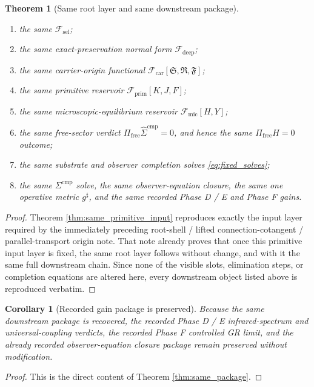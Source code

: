 \documentclass[11pt]{article}
\newcommand{\CompletedMetric}{g^{\sharp}}
\newcommand{\CompLift}{\widehat\Sigma^{\mathrm{cmp}}}
\newcommand{\FreeProj}{\Pi_{\mathrm{free}}}
\newcommand{\GaugeAux}{Y}
\newcommand{\MicFunctional}{\mathscr F_{\mathrm{mic}}}
\newcommand{\PrimFunctional}{\mathscr F_{\mathrm{prim}}}
\newcommand{\CarrierFunctional}{\mathscr F_{\mathrm{car}}}
\newcommand{\DeepFunctional}{\mathscr F_{\mathrm{deep}}}
\newcommand{\StemFunctional}{\mathscr F_{\mathrm{sel}}}
\newcommand{\PrimStrain}{K}
\newcommand{\PrimNeutral}{J}
\newcommand{\PrimFree}{F}
\newcommand{\CarrierSeed}{\mathfrak S}
\newcommand{\RelabelSeed}{\mathfrak R}
\newcommand{\FreeSeed}{\mathfrak F}
\newtheorem{corollary}{Corollary}
\newtheorem{theorem}{Theorem}
\begin{document}
\begin{theorem}[Same root layer and same downstream package]
\begin{enumerate}
    \item the same \(\StemFunctional\);
    \item the same exact-preservation normal form \(\DeepFunctional\);
    \item the same carrier-origin functional \(\CarrierFunctional[\CarrierSeed,\RelabelSeed,\FreeSeed]\);
    \item the same primitive reservoir \(\PrimFunctional[\PrimStrain,\PrimNeutral,\PrimFree]\);
    \item the same microscopic-equilibrium reservoir \(\MicFunctional[H,\GaugeAux]\);
    \item the same free-sector verdict \(\FreeProj\CompLift=0\), and hence the same \(\Pi_{\mathrm{free}}H=0\) outcome;
    \item the same substrate and observer completion solves \eqref{eq:fixed_solves};
    \item the same \(\Sigma^{\mathrm{cmp}}\) solve, the same observer-equation closure, the same one operative metric \(\CompletedMetric\), and the same recorded Phase D / E and Phase F gains.
\end{enumerate}
\end{theorem}

\begin{proof}
Theorem \ref{thm:same_primitive_input} reproduces exactly the input layer required by the immediately preceding root-shell / lifted connection-cotangent / parallel-transport origin note. That note already proves that once this primitive input layer is fixed, the same root layer follows without change, and with it the same full downstream chain. Since none of the visible slots, elimination steps, or completion equations are altered here, every downstream object listed above is reproduced verbatim.
\end{proof}

\begin{corollary}[Recorded gain package is preserved]
\label{cor:gains}
Because the same downstream package is recovered, the recorded Phase D / E infrared-spectrum and universal-coupling verdicts, the recorded Phase F controlled GR limit, and the already recorded observer-equation closure package remain preserved without modification.
\end{corollary}

\begin{proof}
This is the direct content of Theorem \ref{thm:same_package}.
\end{proof}
\end{document}
